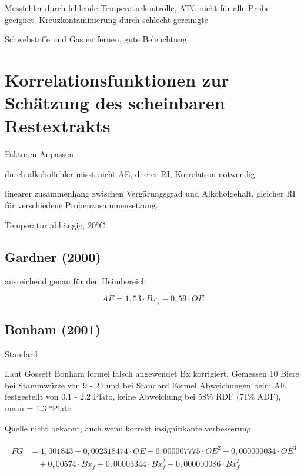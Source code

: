 \documentclass[a4paper,parskip=half]{scrartcl}
\newcommand{\bxic}{\mathit{OE}}
\newcommand{\bxf}{\mathit{Bx}_f}
\newcommand{\fg}{\mathit{FG}}
\begin{document}
Messfehler durch fehlende Temperaturkontrolle, ATC nicht
für alle Probe geeignet.
Kreuzkontaminierung durch schlecht gereinigte
\autocite{Depalma2017}

Schwebstoffe und Gas entfernen, gute Beleuchtung
\autocite{Gamer1959}

\section*{Korrelationsfunktionen zur Schätzung des scheinbaren Restextrakts}

Faktoren Anpassen
\autocite{Gamer1959}

durch alkoholfehler misst nicht AE, dnerer RI, Korrelation notwendig.
\autocite{Terrill2010a}

linearer zusammenhang zwischen Vergärungsgrad und Alkoholgehalt,
gleicher RI für verschiedene Probenzusammensetzung.
\autocite{Terrill2010}

Temperatur abhängig, 20°C
\autocite{Gossett2012}

\subsection*{Gardner (2000)}

ausreichend genau für den Heimbereich
\autocite{Bonham2001}

\begin{equation}
\mathit{AE}=1,53 \cdot \bxf - 0,59 \cdot \bxic
\label{eq:gardner} 
\end{equation}

\subsection*{Bonham (2001)}

Standard \autocite{Terrill2010a}

Laut Gossett Bonham formel falsch angewendet Bx korrigiert.
Gemessen 10 Biere bei Stammwürze von 9 - 24 und bei Standard Formel Abweichungen
beim AE festgestellt von 0.1 - 2.2 Plato, keine Abweichung bei
58\% RDF (71\% ADF), mean = 1.3 °Plato
\autocite{Terrill2010a}

Quelle nicht bekannt, auch wenn korrekt insignifikante verbesserung
\autocite{Terrill2011}

\autocite{Bonham2001}

\begin{align}
\begin{split}
\fg &= 1,001843 - 0,002318474 \cdot \bxic - 0,000007775 \cdot \bxic^2 -
0,000000034 \cdot \bxic^3 \\
& \quad + 0,00574 \cdot \bxf +
0,00003344 \cdot \bxf^2 + 0,000000086 \cdot \bxf^3
\end{split} \label{eq:bonham} 
\end{align}
\end{document}
